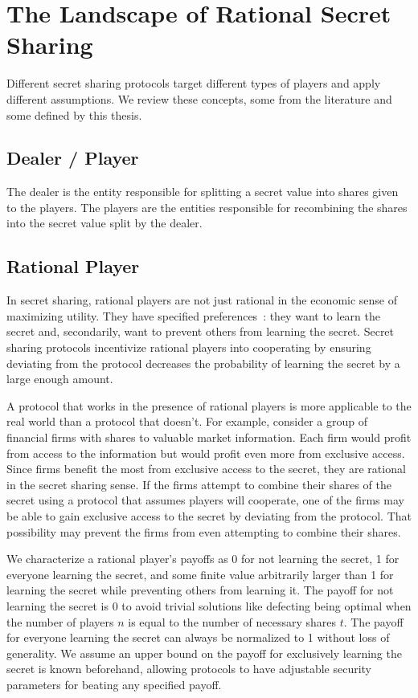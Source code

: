 \documentclass{dalcsthesis}
\begin{document}
\section{The Landscape of Rational Secret Sharing}

Different secret sharing protocols target different types of players and apply different assumptions. We review these concepts, some from the literature and some defined by this thesis.

\subsection{Dealer / Player}

The dealer is the entity responsible for splitting a secret value into shares given to the players. The players are the entities responsible for recombining the shares into the secret value split by the dealer.

\subsection{Rational Player}

In secret sharing, rational players are not just rational in the economic sense of maximizing utility. They have specified preferences~\cite{halpern04}: they want to learn the secret and, secondarily, want to prevent others from learning the secret. Secret sharing protocols incentivize rational players into cooperating by ensuring deviating from the protocol decreases the probability of learning the secret by a large enough amount.

A protocol that works in the presence of rational players is more applicable to the real world than a protocol that doesn't. For example, consider a group of financial firms with shares to valuable market information. Each firm would profit from access to the information but would profit even more from exclusive access. Since firms benefit the most from exclusive access to the secret, they are rational in the secret sharing sense. If the firms attempt to combine their shares of the secret using a protocol that assumes players will cooperate, one of the firms may be able to gain exclusive access to the secret by deviating from the protocol. That possibility may prevent the firms from even attempting to combine their shares.

We characterize a rational player's payoffs as 0 for not learning the secret, 1 for everyone learning the secret, and some finite value arbitrarily larger than 1 for learning the secret while preventing others from learning it. The payoff for not learning the secret is 0 to avoid trivial solutions like defecting being optimal when the number of players $n$ is equal to the number of necessary shares $t$. The payoff for everyone learning the secret can always be normalized to 1 without loss of generality. We assume an upper bound on the payoff for exclusively learning the secret is known beforehand, allowing protocols to have adjustable security parameters for beating any specified payoff.
\end{document}
